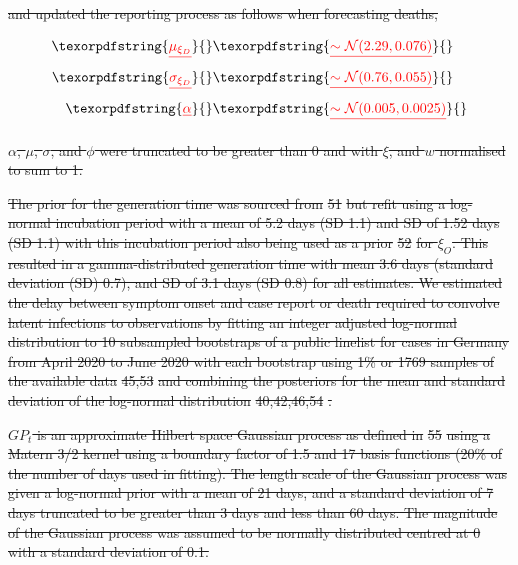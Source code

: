 \documentclass[10pt,letterpaper]{article}
\providecommand{\DIFdeltex}[1]{{\protect\color{red}\sout{#1}}}                      %
\providecommand{\DIFdel}[1]{\texorpdfstring{\DIFdeltex{#1}}{}} %
\begin{document}
\DIFdel{and updated the reporting process as follows when forecasting deaths,
}%

\begin{align*}
    \DIFdel{\mu_{\xi_{D}} }&\DIFdel{\sim \mathcal{N}(2.29, 0.076) }\\
    \DIFdel{\sigma_{\xi_{D}} }&\DIFdel{\sim \mathcal{N}(0.76, 0.055) }\\
    \DIFdel{\alpha }&\DIFdel{\sim \mathcal{N}(0.005, 0.0025) 
}\end{align*}%

\DIFdel{\(\alpha\), \(\mu\), \(\sigma\), and \(\phi\) were truncated to be
greater than 0 and with \(\xi\), and \(w\) normalised to sum to 1.
}%

\DIFdel{The prior for the generation time was sourced from }%
\DIFdel{51}%
\DIFdel{but refit
using a log-normal incubation period with a mean of 5.2 days (SD 1.1)
and SD of 1.52 days (SD 1.1) with this incubation period also being used
as a prior }%
\DIFdel{52}%
\DIFdel{for \(\xi_{O}\). This resulted in a
gamma-distributed generation time with mean 3.6 days (standard deviation
(SD) 0.7), and SD of 3.1 days (SD 0.8) for all estimates. We estimated
the delay between symptom onset and case report or death required to
convolve latent infections to observations by fitting an integer
adjusted log-normal distribution to 10 subsampled bootstraps of a public
linelist for cases in Germany from April 2020 to June 2020 with each
bootstrap using 1\% or 1769 samples of the available data }%
\DIFdel{45,53}%
\DIFdel{and combining the posteriors for the mean and standard deviation of the
log-normal distribution }%
\DIFdel{40,42,46,54}%
\DIFdel{.
}%

\DIFdel{\(GP_t\) is an approximate Hilbert space Gaussian process as defined in
}%
\DIFdel{55}%
\DIFdel{using a Matern 3/2 kernel using a boundary factor of 1.5 and 17
basis functions (20\% of the number of days used in fitting). The length
scale of the Gaussian process was given a log-normal prior with a mean
of 21 days, and a standard deviation of 7 days truncated to be greater
than 3 days and less than 60 days. The magnitude of the Gaussian process
was assumed to be normally distributed centred at 0 with a standard
deviation of 0.1.
}%
\end{document}
